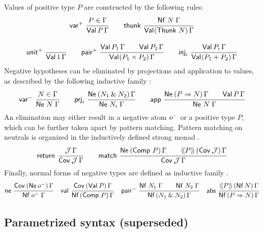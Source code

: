 \documentclass[a4paper,USenglish,cleveref, autoref]{lipics-v2019}
\begin{document}
Values 
of positive type $P$ are constructed by the
following rules:
\begin{gather*}
  \nru{\pvar}{P \in \Gamma}{\PVal P \Gamma}
\qquad
  \nru{\tthunk}{\Nf N \Gamma}{\PValP{\Thunk\,N}\Gamma}
\\[2ex]
  \nru{\punit}{}{\PVal{\tyone}\Gamma}
\qquad
  \nru{\ppair}
      {\PVal{P_1}\Gamma \qquad \PVal{P_2}\Gamma}
      {\PValP{P_1 \times P_2}\Gamma}
\qquad
  \nru{\tinj_i}{\PVal{P_i}\Gamma}{\PValP{P_1 + P_2}\Gamma}
\end{gather*}
Negative hypotheses can be eliminated by projections and application
to values, as described by the following inductive family
:
\begin{gather*}
  \nru{\nvar}{N \in \Gamma}{\Ne N \Gamma}
\qquad
  \nru{\tprj_i}
      {\NeP {N_1 \ntimes N_2} \Gamma}
      {\Ne {N_i} \Gamma}
\qquad
  \nru{\tapp}
      {\NeP {P \To N} \Gamma \qquad \PVal P \Gamma}
      {\Ne N \Gamma}
\end{gather*}
An elimination may either result in a negative atom $o^-$ or a
positive type $P$, which can be further taken apart by pattern
matching.  Pattern matching on neutrals is organized in the
inductively defined strong monad \fbox{$\Cov$}.
\begin{gather*}
  \nru{\treturn}{\J\,\Gamma}{\Cover \J \Gamma}
\qquad
  \nru{\tmatch}
      {\NeP {\Comp\,P} \Gamma \qquad \AddHypP P {\Cov\,\J} \Gamma}
      {\Cover \J \Gamma}
\end{gather*}
Finally, normal forms of negative types are defined as inductive
family .
\begin{gather*}
  \nru{\tne}
      {\CoverP {\tNe\,\natom} \Gamma}
      {\Nf {\natom} \Gamma}
\quad
  \nru{\tval}
      {\CoverP {\tVal\,P}  \Gamma}
      {\NfP {\Comp\,P} \Gamma}
\quad
  \nru{\npair}
      {\Nf {N_1} \Gamma \qquad \Nf {N_2} \Gamma}
      {\NfP {N_1 \ntimes N_2} \Gamma}
\quad
  \nru{\tabs}
      {\AddHypP P {\tNf\, N} \Gamma}
      {\NfP {P \To N} \Gamma}
\end{gather*}




\clearpage

\subsection{Parametrized syntax (superseded)}
\end{document}
